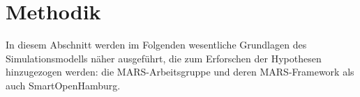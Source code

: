 %
\chapter{Methodik}\label{ch:methodik}

In diesem Abschnitt werden im Folgenden wesentliche Grundlagen des Simulationsmodells näher ausgeführt, die zum Erforschen der Hypothesen hinzugezogen werden: die MARS-Arbeitsgruppe und deren MARS-Framework als auch SmartOpenHamburg.





